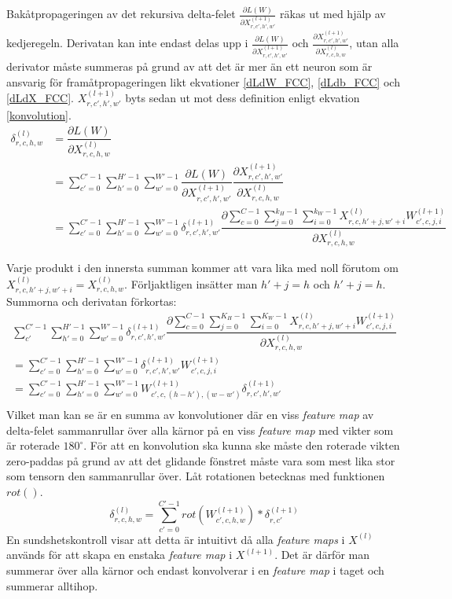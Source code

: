 \documentclass[a4paper,11pt,twoside]{article}
\newcommand*{\pd}[2]{\ensuremath{\dfrac{\partial #1}{\partial #2}}}
\newcommand*{\inpd}[2]{\ensuremath{\frac{\partial #1}{\partial #2}}}
\begin{document}
Bakåtpropageringen av det rekursiva delta-felet $\inpd{L(W)}{X^{(l+1)}_{r,c',h',w'}}$ räkas ut med hjälp av kedjeregeln. Derivatan kan inte endast delas upp i $\inpd{L(W)}{X^{(l+1)}_{r,c',h',w'}}$ och $\inpd{X^{(l+1)}_{r,c',h',w'}}{X^{(l)}_{r,c,h,w}}$, utan alla derivator måste summeras på grund av att det är mer än ett neuron som är ansvarig för framåtpropageringen likt ekvationer \eqref{dLdW_FCC}, \eqref{dLdb_FCC} och \eqref{dLdX_FCC}. $X^{(l+1)}_{r,c',h',w'}$ byts sedan ut mot dess definition enligt ekvation \eqref{konvolution}. \cite{convmath} \cite{webconv1} \cite{webconv2} \cite{webconv3}
\begin{equation}\label{konvolutionbackprop}
\begin{split}
	\delta^{(l)}_{r,c,h,w}
		& = \pd{L(W)}{X^{(l)}_{r,c,h,w}} \\
		& = \sum^{C'-1}_{c'=0} \sum^{H'-1}_{h'=0} \sum^{W'-1}_{w'=0} \pd{L(W)}{X^{(l+1)}_{r,c',h',w'}} \pd{X^{(l+1)}_{r,c',h',w'}}{X^{(l)}_{r,c,h,w}} \\
		& = \sum^{C'-1}_{c'=0} \sum^{H'-1}_{h'=0} \sum^{W'-1}_{w'=0} \delta^{(l+1)}_{r,c',h',w'} \pd{\sum^{C-1}_{c=0} \sum^{k_H-1}_{j=0} \sum^{k_W-1}_{i=0} X^{(l)}_{r, c, h'+j, w'+i}W^{(l+1)}_{c', c, j, i}}{X^{(l)}_{r,c,h,w}}
\end{split}
\end{equation}

Varje produkt i den innersta summan kommer att vara lika med noll förutom om $X^{(l)}_{r, c, h'+j, w'+i} = X^{(l)}_{r,c,h,w}$. Förljaktligen insätter man $h'+j = h$ och $h'+j = h$. Summorna och derivatan förkortas: \cite{webconv1} \cite{webconv2} \cite{webconv3}
\begin{multline}
\sum^{C'-1}_{c'} \sum^{H'-1}_{h'=0} \sum^{W'-1}_{w'=0} \delta^{(l+1)}_{r,c',h',w'} \pd{\sum^{C-1}_{c=0} \sum^{K_H-1}_{j=0} \sum^{K_W-1}_{i=0} X^{(l)}_{r, c, h'+j, w'+i}W^{(l+1)}_{c', c, j, i}}{X^{(l)}_{r,c,h,w}} \\
	 = \sum^{C'-1}_{c'=0} \sum^{H'-1}_{h'=0} \sum^{W'-1}_{w'=0} \delta^{(l+1)}_{r,c',h',w'} W^{(l+1)}_{c', c, j, i} \\
	 = \sum^{C'-1}_{c'=0} \sum^{H'-1}_{h'=0} \sum^{W'-1}_{w'=0} W^{(l+1)}_{c', c, (h-h'), (w-w')}  \delta^{(l+1)}_{r,c',h',w'}   \\
\end{multline}
Vilket man kan se är en summa av konvolutioner där en viss \textit{feature map} av delta-felet sammanrullar över alla kärnor på en viss \textit{feature map} med vikter som är roterade $180^\circ$. För att en konvolution ska kunna ske måste den roterade vikten zero-paddas på grund av att det glidande fönstret måste vara som mest lika stor som tensorn den sammanrullar över. Låt rotationen betecknas med funktionen $rot()$. \cite{webconv1} \cite{webconv2} \cite{webconv3}
\begin{equation}
\delta^{(l)}_{r,c,h,w} = \sum^{C'-1}_{c'=0} rot(W^{(l+1)}_{c',c,h,w}) * \delta^{(l+1)}_{r,c'}
\end{equation}
En sundshetskontroll visar att detta är intuitivt då alla \textit{feature maps} i $X^{(l)}$ används för att skapa en enstaka \textit{feature map} i $X^{(l+1)}$. Det är därför man summerar över alla kärnor och endast konvolverar i en \textit{feature map} i taget och summerar alltihop. \cite{cs231n}
\end{document}
